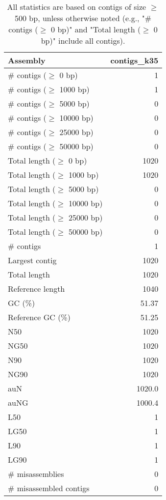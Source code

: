 \documentclass[12pt,a4paper]{article}
\begin{document}
\begin{table}[ht]
\begin{center}
\caption{All statistics are based on contigs of size $\geq$ 500 bp, unless otherwise noted (e.g., "\# contigs ($\geq$ 0 bp)" and "Total length ($\geq$ 0 bp)" include all contigs).}
\begin{tabular}{|l*{1}{|r}|}
\hline
Assembly & contigs\_k35 \\ \hline
\# contigs ($\geq$ 0 bp) & 1 \\ \hline
\# contigs ($\geq$ 1000 bp) & 1 \\ \hline
\# contigs ($\geq$ 5000 bp) & 0 \\ \hline
\# contigs ($\geq$ 10000 bp) & 0 \\ \hline
\# contigs ($\geq$ 25000 bp) & 0 \\ \hline
\# contigs ($\geq$ 50000 bp) & 0 \\ \hline
Total length ($\geq$ 0 bp) & 1020 \\ \hline
Total length ($\geq$ 1000 bp) & 1020 \\ \hline
Total length ($\geq$ 5000 bp) & 0 \\ \hline
Total length ($\geq$ 10000 bp) & 0 \\ \hline
Total length ($\geq$ 25000 bp) & 0 \\ \hline
Total length ($\geq$ 50000 bp) & 0 \\ \hline
\# contigs & 1 \\ \hline
Largest contig & 1020 \\ \hline
Total length & 1020 \\ \hline
Reference length & 1040 \\ \hline
GC (\%) & 51.37 \\ \hline
Reference GC (\%) & 51.25 \\ \hline
N50 & 1020 \\ \hline
NG50 & 1020 \\ \hline
N90 & 1020 \\ \hline
NG90 & 1020 \\ \hline
auN & 1020.0 \\ \hline
auNG & 1000.4 \\ \hline
L50 & 1 \\ \hline
LG50 & 1 \\ \hline
L90 & 1 \\ \hline
LG90 & 1 \\ \hline
\# misassemblies & 0 \\ \hline
\# misassembled contigs & 0 \\ \hline

\end{tabular}
\end{center}
\end{table}
\end{document}
